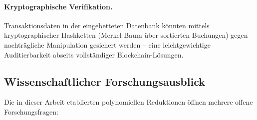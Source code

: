 \documentclass[a4paper,12pt]{article}
\begin{document}
\paragraph{Kryptographische Verifikation.}
Transaktionsdaten in der eingebetteten Datenbank könnten mittels
kryptographischer Hashketten (Merkel-Baum über sortierten Buchungen) gegen
nachträgliche Manipulation gesichert werden – eine leichtgewichtige
Auditierbarkeit abseits vollständiger Blockchain-Lösungen.

\subsection{Wissenschaftlicher Forschungsausblick}
\label{sub:ausblick_forschung}

Die in dieser Arbeit etablierten polynomiellen Reduktionen öffnen mehrere offene Forschungsfragen:
\end{document}
